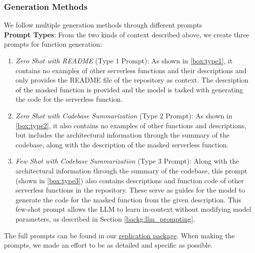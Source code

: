 
\vspace*{-10pt}

\subsubsection{Generation Methods} \label{study:generation}
We follow multiple generation methods through different prompts\\
\textbf{Prompt Types}:
From the two kinds of context described above, we create three prompts for function generation:
\begin{enumerate}
    \item \textit{Zero Shot with README} (Type 1 Prompt): As shown in \ref{box:type1}, it contains no examples of other serverless functions and their descriptions and only provides the README file of the repository as context. The description of the masked function is provided and the model is tasked with generating the code for the serverless function.
    
    \vspace{-5pt}
    \item \textit{Zero Shot with Codebase Summarization} (Type 2 Prompt): As shown in \ref{box:type2}, it also contains no examples of other functions and descriptions, but includes the architectural information through the summary of the codebase, along with the description of the masked serverless function.
    

    \item \textit{Few Shot with Codebase Summarization} (Type 3 Prompt): Along with the architectural information through the summary of the codebase, this prompt (shown in \ref{box:type3}) also contains descriptions and function code of other serverless functions in the repository. These serve as guides for the model to generate the code for the masked function from the given description. This few-shot prompt allows the LLM to learn in-context without modifying model parameters, as described in Section \ref{backg:llm_prompting}.
    
\end{enumerate}
The full prompts can be found in our \href{https://doi.org/10.5281/zenodo.14539782}{replication package}. When making the prompts, we made an effort to be as detailed and specific as possible.

